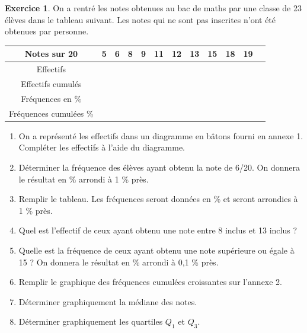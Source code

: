 \documentclass{article}
\theoremstyle{definition}
\newtheorem{exercice}{Exercice}
\begin{document}
\begin{exercice}
  On a rentré les notes obtenues au bac de maths par une classe de 23 élèves dans le tableau suivant. Les notes qui ne sont pas inscrites n’ont été obtenues par personne.

  \begin{center}
    \renewcommand{\arraystretch}{2}
    \begin{tabular}{|c*{11}{|p{18pt}}|}
      \hline
      Notes sur 20 & 5 & 6 & 8 & 9 & 11 & 12 & 13 & 15 & 18 & 19 \\
      \hline
      Effectifs & & & & & & & & & & \\
      \hline
      Effectifs cumulés & & & & & & & & & & \\
      \hline
      Fréquences en \% & & & & & & & & & & \\
      \hline
      Fréquences cumulées \% & & & & & & & & & & \\
      \hline
    \end{tabular}
  \end{center}

  \begin{enumerate}
    \item On a représenté les effectifs dans un diagramme en bâtons fourni en annexe 1. Compléter les effectifs à l’aide du diagramme.
    \item Déterminer la fréquence des élèves ayant obtenu la note de 6/20. On donnera le résultat en \% arrondi à 1 \% près.
    \item Remplir le tableau. Les fréquences seront données en \% et seront arrondies à 1 \% près.
    \item Quel est l’effectif de ceux ayant obtenu une note entre 8 inclus et 13 inclus ?
    \item Quelle est la fréquence de ceux ayant obtenu une note supérieure ou égale à 15 ? On donnera le résultat en \% arrondi à 0,1 \% près.
    \item Remplir le graphique des fréquences cumulées croissantes sur l’annexe 2.
    \item Déterminer graphiquement la médiane des notes.
    \item Déterminer graphiquement les quartiles $Q_1$ et $Q_3$.
  \end{enumerate}
\end{exercice}

\vfill

\newpage
\end{document}
